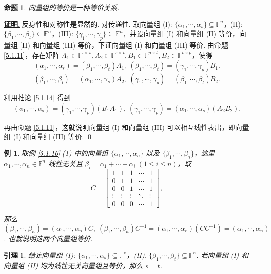 \documentclass[10pt,openany]{article}
\theoremstyle{thmstyle} %
\theoremstyle{defstyle} %
\newtheorem{lemma}[theorem]{引理}
\theoremstyle{prostyle} %
\newtheorem{proposition}[theorem]{命题}
\theoremstyle{exastyle}
\newtheorem{example}[theorem]{例}
\theoremstyle{remstyle}
\renewenvironment{proof}[1][证明]{\par\underline{\textbf{#1.}} \;\fangsong}{\qed\par}
\newcommand{\F}{\mathbb{F}}
\begin{document}
\begin{proposition} \label{5.1.18}
	向量组的等价是一种等价关系.
\end{proposition}


\begin{proof}
	反身性和对称性是显然的. 对传递性. 取向量组 (I): \( \{\alpha_1,\cdots,\alpha_s\} \subseteq \F^n \)，(II): \( \{\beta_1,\cdots,\beta_t\} \subseteq \F^n \)，(III): \( \{\gamma_1,\cdots,\gamma_p\} \subseteq \F^n \)，并设向量组 (I) 和向量组 (II) 等价，向量组 (II) 和向量组 (III) 等价，下证向量组 (I) 和向量组 (III) 等价. 由命题 \ref{5.1.11}，存在矩阵 \( A_1 \in \F^{t \times s}, A_2 \in \F^{s \times t}, B_1 \in \F^{p \times t}, B_2 \in \F^{t \times p} \)，使得
	\[ (\alpha_1,\cdots,\alpha_s)=(\beta_1,\cdots,\beta_t)A_1, \; (\beta_1,\cdots,\beta_t)=(\gamma_1,\cdots,\gamma_p)B_1. \]
	\[ (\beta_1,\cdots,\beta_t)=(\alpha_1,\cdots,\alpha_s)A_2, \; (\gamma_1,\cdots,\gamma_p)=(\beta_1,\cdots,\beta_t)B_2. \]
	
	利用推论 \ref{5.1.14} 得到 
	\[ (\alpha_1,\cdots,\alpha_s)=(\gamma_1,\cdots,\gamma_p)(B_1A_1), \; (\gamma_1,\cdots,\gamma_p)=(\alpha_1,\cdots,\alpha_s)(A_2B_2). \]
	
	再由命题 \ref{5.1.11}，这就说明向量组 (I) 和向量组 (III) 可以相互线性表出，即向量组 (I) 和向量组 (III) 等价.
\end{proof}


\begin{example}
	取例 \ref{5.1.16} (1) 中的向量组 \( \{\alpha_1,\cdots,\alpha_n\} \) 以及 \( \{\beta_1,\cdots,\beta_n\} \)，这里 \( \alpha_1,\cdots,\alpha_n \in \F^n \) 线性无关且 \( \beta_i=\alpha_1+\cdots+\alpha_i \; (1 \leq i \leq n) \)，取
	\[ C=\begin{bmatrix}
		1 & 1 & 1 & \cdots & 1 \\
		0 & 1 & 1 & \cdots & 1 \\
		0 & 0 & 1 & \cdots & 1 \\
		\vdots & \vdots & \vdots & \ddots & \vdots \\
		0 & 0 & 0 & \cdots & 1
	\end{bmatrix}, \]
	
	那么 \( (\beta_1,\cdots,\beta_n)=(\alpha_1,\cdots,\alpha_n)C, \; (\beta_1,\cdots,\beta_n)C^{-1}=(\alpha_1,\cdots,\alpha_n)(CC^{-1})=(\alpha_1,\cdots,\alpha_n) \). 也就说明这两个向量组等价.
\end{example}

\begin{lemma} \label{5.1.20}
	给定向量组 (I): \( \{\alpha_1,\cdots,\alpha_s\} \subseteq \F^n \)，(II): \( \{\beta_1,\cdots,\beta_t\} \subseteq \F^n \). 若向量组 (I) 和向量组 (II) 均为线性无关向量组且等价，那么 \( s=t \).
\end{lemma}
\end{document}
